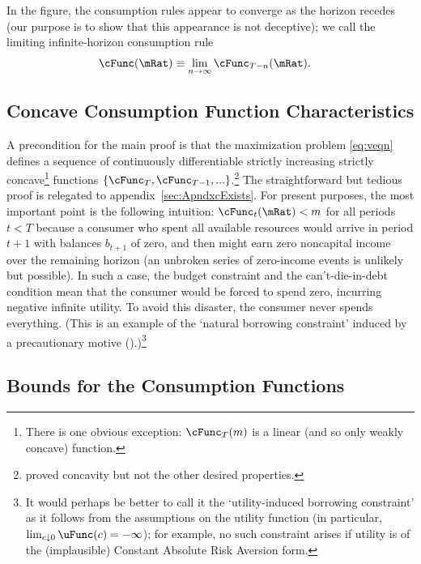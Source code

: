 \documentclass[./BufferStockTheory.tex]{subfiles}
\begin{document}
In the figure, the consumption rules appear to converge as the horizon
recedes (our purpose is to show that this appearance is not deceptive); we
call the limiting infinite-horizon consumption rule
\begin{align}
\cFunc(\mRat)  & \equiv  \lim_{n \rightarrow \infty} \cFunc_{T-n}(\mRat).
\end{align}

\hypertarget{Concave-Consumption-Function-Characteristics}{}
\subsection{Concave Consumption Function Characteristics}\label{sec:cExists}

A precondition for the main proof is that the maximization problem \eqref{eq:veqn} defines a sequence of continuously differentiable strictly increasing strictly concave\footnote{There is one obvious exception: $\cFunc_{T}(m)$ is a linear (and so only weakly concave) function.} functions $\{\cFunc_{T},\cFunc_{T-1},...\}$.\footnote{\cite{ckConcavity} proved concavity but not the other desired properties.}  The straightforward but tedious proof is relegated to appendix~\ref{sec:ApndxcExists}.  For present purposes, the most important point is the following intuition: $\cFunc_{t}(\mRat) < m$ for all periods $t < T$ because a consumer who spent all available resources would arrive in period $t+1$ with balances $b_{t+1}$ of zero, and then might earn zero noncapital income over the remaining horizon (an unbroken series of zero-income events is unlikely but possible).  In such a case, the budget constraint and the can't-die-in-debt condition mean that the consumer would be forced to spend zero, incurring negative infinite utility.  To avoid this disaster, the consumer never spends everything.  (This is an example of the `natural borrowing constraint' induced by a precautionary motive (\cite{zeldesStochastic}).)\footnote{It would perhaps be better to call it the `utility-induced borrowing constraint' as it follows from the assumptions on the utility function (in particular, $\lim_{c \downarrow 0} \uFunc(c)=-\infty$); for example, no such constraint arises if utility is of the (implausible) Constant Absolute Risk Aversion form.}

\hypertarget{Bounds-for-the-Consumption-Functions}{}
\subsection{Bounds for the Consumption Functions}
\end{document}
